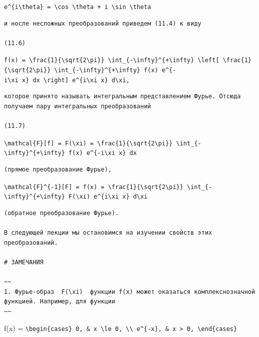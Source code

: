 \documentclass[
  ukrainian,
]{article}
\begin{document}
\texttt{e\^{}\{i\textbackslash{}theta\}\ =\ \textbackslash{}cos\ \textbackslash{}theta\ +\ i\ \textbackslash{}sin\ \textbackslash{}theta}

\begin{verbatim}
и носле несложных преобразований приведем (11.4) к виду

(11.6)
\end{verbatim}

\texttt{f(x)\ =\ \textbackslash{}frac\{1\}\{\textbackslash{}sqrt\{2\textbackslash{}pi\}\}\ \textbackslash{}int\_\{-\textbackslash{}infty\}\^{}\{+\textbackslash{}infty\}\ \textbackslash{}left{[}\ \textbackslash{}frac\{1\}\{\textbackslash{}sqrt\{2\textbackslash{}pi\}\}\ \textbackslash{}int\_\{-\textbackslash{}infty\}\^{}\{+\textbackslash{}infty\}\ f(x)\ e\^{}\{-i\textbackslash{}xi\ x\}\ dx\ \textbackslash{}right{]}\ e\^{}\{i\textbackslash{}xi\ x\}\ d\textbackslash{}xi,}

\begin{verbatim}
которое принято называть интегральным представлением Фурье. Отсюда получаем пару интегральных преобразований

(11.7)
\end{verbatim}

\texttt{\textbackslash{}mathcal\{F\}{[}f{]}\ =\ F(\textbackslash{}xi)\ =\ \textbackslash{}frac\{1\}\{\textbackslash{}sqrt\{2\textbackslash{}pi\}\}\ \textbackslash{}int\_\{-\textbackslash{}infty\}\^{}\{+\textbackslash{}infty\}\ f(x)\ e\^{}\{-i\textbackslash{}xi\ x\}\ dx}

\begin{verbatim}
(прямое преобразование Фурье),
\end{verbatim}

\texttt{\textbackslash{}mathcal\{F\}\^{}\{-1\}{[}F{]}\ =\ f(x)\ =\ \textbackslash{}frac\{1\}\{\textbackslash{}sqrt\{2\textbackslash{}pi\}\}\ \textbackslash{}int\_\{-\textbackslash{}infty\}\^{}\{+\textbackslash{}infty\}\ F(\textbackslash{}xi)\ e\^{}\{i\textbackslash{}xi\ x\}\ d\textbackslash{}xi}

\begin{verbatim}
(обратное преобразование Фурье).

В следующей лекции мы остановимся на изучении свойств этих преобразований.

# ЗАМЕЧАНИЯ

~~
1. Фурье-образ  F(\xi)  функции f(x) может оказаться комплекснозначной функцией. Например, для функции
~~
\end{verbatim}

f(x) =
\texttt{\textbackslash{}begin\{cases\}\ 0,\ \&\ x\ \textbackslash{}le\ 0,\ \textbackslash{}\textbackslash{}\ e\^{}\{-x\},\ \&\ x\ \textgreater{}\ 0,\ \textbackslash{}end\{cases\}}
\end{document}
